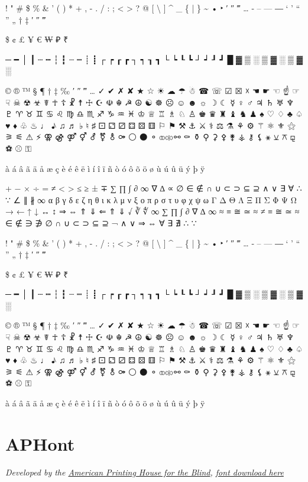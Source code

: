 \begin{raggedright}
{%
! " \# \$ \% \& ' ( ) * + , - . / : ; \textless{} \textgreater{} ? @ [ \textbackslash{} ] \^{} \_ \{ | \} \~{}
• ‣ ′ ″ ‴ … ‐ – — ― ‘ ’ “ ” „ † ‡ ′ ″ ‴

\$ ¢ £ ¥ € ₩ ₽ ₹

─ ━ │ ┃ ┄ ┅ ┆ ┇ ┈ ┉ ┊ ┋ ┌ ┍ ┎ ┏ ┐ ┑ ┒ ┓ └ ┕ ┖ ┗ ┘ ┙ ┚ ┛
█ ▓ ▒ ░ ▒ ▓ ░ ▒ ▓ ░

© ® ™ § ¶ † ‡ ‰ ′ ″ ‴ … ✓ ✔ ✗ ✘ ★ ☆ ☀ ☁ ☂ ☃ ☎ ☏ ☑ ☒ ☓ ☚ ☛ ☜ ☝ ☞ ☟ ☠ ☢ ☣ ☤ ☥ ☦ ☧ ☨ ☩ ☪ ☫ ☬ ☭ ☮ ☯ ☸ ☹ ☺ ☻ ☼ ☽ ☾ ☿ ♀ ♂ ♃ ♄ ♅ ♆ ♇ ♈ ♉ ♊ ♋ ♌ ♍ ♎ ♏ ♐ ♑ ♒ ♓ ♔ ♕ ♖ ♗ ♘ ♙ ♚ ♛ ♜ ♝ ♞ ♟ ♠ ♡ ♢ ♣ ♤ ♥ ♦ ♧ ♨ ♩ ♪ ♫ ♬ ♭ ♮ ♯ ⚀ ⚁ ⚂ ⚃ ⚄ ⚅ ⚐ ⚑ ⚒ ⚓ ⚔ ⚕ ⚖ ⚗ ⚘ ⚙ ⚚ ⚛ ⚜ ⚝ ⚞ ⚟ ⚠ ⚡ ⚢ ⚣ ⚤ ⚥ ⚦ ⚧ ⚨ ⚩ ⚪ ⚫ ⚬ ⚭ ⚮ ⚯ ⚰ ⚱ ⚲ ⚳ ⚴ ⚵ ⚶ ⚷ ⚸ ⚹ ⚺ ⚻ ⚼ ⚽ ⚾ ⚿

à á â ã ä å æ ç è é ê ë ì í î ï ñ ò ó ô õ ö ø ù ú û ü ý þ ÿ

+ − × ÷ = ≠ < > ≤ ≥ ± ∓
∑ ∏ ∫ ∂ ∞ ∇ ∆ ∝ ∅ ∈ ∉ ∩ ∪ ⊂ ⊃ ⊆ ⊇ ∧ ∨ ∃ ∀ ∴ ∵ ∠ ∥ ∦ ∞
α β γ δ ε ζ η θ ι κ λ μ ν ξ ο π ρ σ τ υ φ χ ψ ω
Γ Δ Θ Λ Ξ Π Σ Φ Ψ Ω
→ ← ↑ ↓ ↔ ↕ ⇒ ⇔ ⇑ ⇓ ⇐ ⇑ ⇓
√ ∛ ∜ ∞ ∑ ∏ ∫ ∂ ∇ ∆ ∞ ≈ ≡ ≅ ≃ ≈ ≠ ≡ ≅ ≃ ≈
∈ ∉ ∋ ∌ ∅ ∩ ∪ ⊂ ⊃ ⊆ ⊇
¬ ∧ ∨ ⇒ ⇔ ∀ ∃ ∄ ∴ ∵

! " \# \$ \% \& ' ( ) * + , - . / : ; \textless{} \textgreater{} ? @ [ \textbackslash{} ] \^{} \_ \{ | \} \~{}
• ‣ ′ ″ ‴ … ‐ – — ― ‘ ’ “ ” „ † ‡ ′ ″ ‴

\$ ¢ £ ¥ € ₩ ₽ ₹

─ ━ │ ┃ ┄ ┅ ┆ ┇ ┈ ┉ ┊ ┋ ┌ ┍ ┎ ┏ ┐ ┑ ┒ ┓ └ ┕ ┖ ┗ ┘ ┙ ┚ ┛
█ ▓ ▒ ░ ▒ ▓ ░ ▒ ▓ ░

© ® ™ § ¶ † ‡ ‰ ′ ″ ‴ … ✓ ✔ ✗ ✘ ★ ☆ ☀ ☁ ☂ ☃ ☎ ☏ ☑ ☒ ☓ ☚ ☛ ☜ ☝ ☞ ☟ ☠ ☢ ☣ ☤ ☥ ☦ ☧ ☨ ☩ ☪ ☫ ☬ ☭ ☮ ☯ ☸ ☹ ☺ ☻ ☼ ☽ ☾ ☿ ♀ ♂ ♃ ♄ ♅ ♆ ♇ ♈ ♉ ♊ ♋ ♌ ♍ ♎ ♏ ♐ ♑ ♒ ♓ ♔ ♕ ♖ ♗ ♘ ♙ ♚ ♛ ♜ ♝ ♞ ♟ ♠ ♡ ♢ ♣ ♤ ♥ ♦ ♧ ♨ ♩ ♪ ♫ ♬ ♭ ♮ ♯ ⚀ ⚁ ⚂ ⚃ ⚄ ⚅ ⚐ ⚑ ⚒ ⚓ ⚔ ⚕ ⚖ ⚗ ⚘ ⚙ ⚚ ⚛ ⚜ ⚝ ⚞ ⚟ ⚠ ⚡ ⚢ ⚣ ⚤ ⚥ ⚦ ⚧ ⚨ ⚩ ⚪ ⚫ ⚬ ⚭ ⚮ ⚯ ⚰ ⚱ ⚲ ⚳ ⚴ ⚵ ⚶ ⚷ ⚸ ⚹ ⚺ ⚻ ⚼ ⚽ ⚾ ⚿

à á â ã ä å æ ç è é ê ë ì í î ï ñ ò ó ô õ ö ø ù ú û ü ý þ ÿ
}
\end{raggedright}
\pagebreak
\section{APHont}\label{trouble7}
\emph{Developed by the \href{https://www.aph.org/resources/large-print-guidelines/}{American Printing House for the Blind}, \href{https://www.aph.org/resources/large-print-guidelines/}{font download here}}

